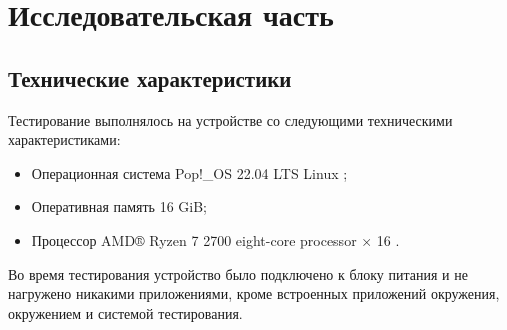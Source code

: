 \chapter{Исследовательская часть}
\section{Технические характеристики}
Тестирование выполнялось на устройстве со следующими техническими характеристиками:
\begin{itemize}
	\item Операционная система Pop!\_OS 22.04 LTS \cite{ubuntu} Linux \cite{linux};
	\item Оперативная память 16 GiB;
	\item Процессор AMD® Ryzen 7 2700 eight-core processor × 16 \cite{amd}.
\end{itemize}
Во время тестирования устройство было подключено к блоку питания и не нагружено никакими приложениями, кроме встроенных приложений окружения, окружением и системой тестирования.

